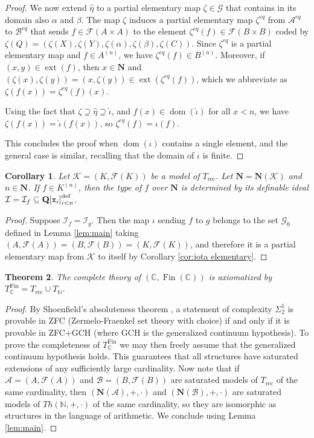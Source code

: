 \documentclass{amsart}
\newcommand{\C}{\mathbb C}
\newcommand{\N}{\mathbb N}
\newcommand{\A}{\mathcal A}
\newcommand{\B}{\mathcal B}
\newcommand{\ca}{\mathcal}
\newcommand{\ideal}[1]{\ca #1}
\newcommand{\Fin}{\operatorname{Fin}}
\newcommand{\dom}{\operatorname{dom}}
\theoremstyle{plain}
\newtheorem{thm}{Theorem}[section]
\newtheorem{cor}[thm]{Corollary}
\theoremstyle{definition}
\newcommand{\F}{\mathcal{F}}
\newcommand{\ext}[1]{\operatorname{ext}(#1)}
\newcommand{\hn}{\mathbf N}
\newcommand{\hQ}{\mathbf Q}
\newcommand{\poly}[1]{{\hQ[{\tt x}_i]}_{i<#1}^\text{def}}
\begin{document}
\begin{proof}
We now extend $\hat \eta$ to a partial elementary map $\zeta \in \ca G$ that contains in its domain also $\alpha$ and $\beta$. 
The map $\zeta$ induces a partial elementary map $\zeta^{eq}$ from $\ca A^{eq}$ to $\ca B^{eq}$ that sends $f\in \F(A\times A)$ to the element $\zeta^{eq}(f) \in \F(B\times B)$ coded by $\zeta(Q) = (\zeta(X),\zeta(Y),\zeta(\alpha), \zeta(\beta), \zeta(C))$. Since $\zeta^{eq}$ is a partial elementary map and $f\in A^{(n)}$, we have $\zeta^{eq}(f)\in B^{(n)}$. Moreover, if $(x,y)\in \ext f$, then $x\in \hn$ and $(\zeta(x),\zeta(y)) = (x, \zeta(y)) \in \ext {\zeta^{eq} (f)}$, which we abbreviate as  $\zeta(f(x)) = \zeta^{eq}(f)(x)$. 

Using the fact that $\zeta \supseteq \hat \eta \supseteq \hat \iota$, and $f(x)\in \dom(\hat \iota)$ for all $x<n$, we have $\zeta(f(x)) = \hat \iota(f(x))$, so $\zeta^{eq}(f) = \iota(f)$. 

This concludes the proof when $\dom(\iota)$ contains a single element, and the general case is similar, recalling that the domain of $\iota$ is finite. 
\end{proof}


\begin{cor}\label{cor:type ideal}
Let $\ca K = (K, \F(K))$ be a model of $T_{\text{rec}}$. Let $\hn = \hn(\ca K)$ and $n\in \hn$. If $f\in K^{(n)}$, then the type of $f$ over $\hn$ is determined by its definable ideal $\ideal I = \ideal I_f\subseteq \poly n$. 
\end{cor}
\begin{proof}
Suppose $\ideal I_f = \ideal I_g$. Then the map $\iota$ sending $f$ to $g$ belongs to the set $\ca G_0$ defined in Lemma \ref{lem:main} taking $(A,\F(A)) = (B, \F(B)) = (K, \F(K))$, and therefore it is a partial elementary map from $\ca K$ to itself by Corollary \ref{cor:iota elementary}. 
\end{proof}


\begin{thm}\label{thm:completeness}
The complete theory of $(\C, \Fin(\C))$ is axiomatized by $T^{\Fin}_\C = T_{\text{rec}} \cup T_{\N}$. 
\end{thm}

\begin{proof}
By Shoenfield's absoluteness theorem \cite[Theorem 98]{Jech}, a statement of complexity $\Sigma^1_2$ is provable in ZFC (Zermelo-Fraenkel set theory with choice) if and only if it is provable in ZFC+GCH (where GCH is the generalized continuum hypothesis). To prove the completeness of $T^{\Fin}_\C$ we may then freely assume that the generalized continuum hypothesis holds. This guarantees that all structures have saturated extensions of any sufficiently large cardinality. Now note that if $\mathcal A= (A, \F (A))$ and $\mathcal B = (B, \F(B))$ are saturated models of $T_{\text{rec}}$ of the same cardinality, then $(\hn (\A),+,\cdot)$ and $(\hn (\B),+,\cdot)$ are saturated models of $Th(\N, +, \cdot)$ of the same cardinality, so they are isomorphic as structures in the language of arithmetic. We conclude using Lemma \ref{lem:main}. 
\end{proof}
\end{document}

